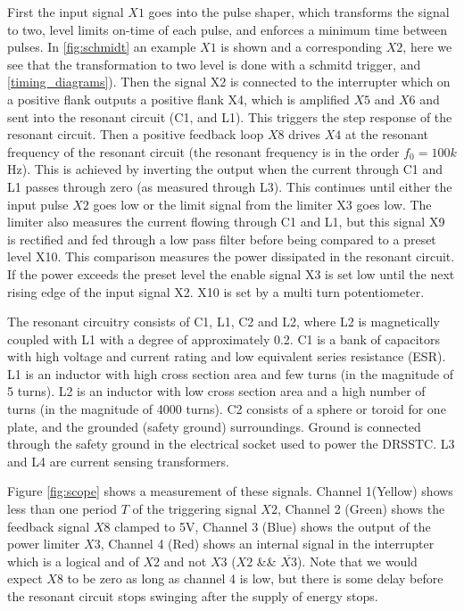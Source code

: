 First the input signal $X1$ goes into the pulse shaper, which transforms the signal to two, level limits on-time of each pulse, and enforces a minimum time between pulses. In \cref{fig:schmidt} an example $X1$ is shown and a corresponding $X2$, here we see that the transformation to two level is done with a schmitd trigger,  and \cref{timing_diagrams}). Then the signal X2 is connected to the interrupter which on a positive flank outputs a positive flank X4, which is amplified $X5$ and $X6$ and sent into the resonant circuit (C1, and L1). This triggers the step response of the resonant circuit. Then a positive feedback loop $X8$ drives $X4$ at the resonant frequency of the resonant circuit (the resonant frequency is in the order $f_0 = 100k$Hz). This is achieved by inverting the output when the current through C1 and L1 passes through zero (as measured through L3). This continues until either the input pulse $X2$ goes low or the limit signal from the limiter X3 goes low.
The limiter also measures the current flowing through C1 and L1, but this signal X9 is rectified and fed through a low pass filter before being compared to a preset level X10. This comparison measures the power dissipated in the resonant circuit. If the power exceeds the preset level the enable signal X3 is set low until the next rising edge of the input signal X2. X10 is set by a multi turn potentiometer.

The resonant circuitry consists of C1, L1, C2 and L2, where L2 is magnetically coupled with L1 with a degree of approximately 0.2. C1 is a bank of capacitors with high voltage and current rating and low equivalent series resistance (ESR). L1 is an inductor with high cross section area and few turns (in the magnitude of 5 turns). L2 is an inductor with low cross section area and a high number of turns (in the magnitude of 4000 turns). C2 consists of a sphere or toroid for one plate, and the grounded (safety ground) surroundings. Ground is connected through the safety ground in the electrical socket used to power the DRSSTC. L3 and L4 are current sensing transformers.

Figure \cref{fig:scope} shows a measurement of these signals. Channel 1(Yellow) shows less than one period $T$ of the triggering signal $X2$, Channel 2 (Green) shows the feedback signal $X8$ clamped to 5V, Channel 3 (Blue) shows the output of the power limiter $X3$, Channel 4 (Red) shows an internal signal in the interrupter which is a logical and of $X2$ and not $X3$ ($X2$ \&\& $\overline{X3}$). Note that we would expect $X8$ to be zero as long as channel 4 is low, but there is some delay before the resonant circuit stops swinging after the supply of energy stops.

